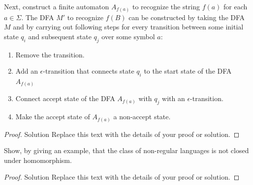 \documentclass[11pt]{article}
\newenvironment{problem}[2][Problem]{\begin{trivlist}
\item[\hskip \labelsep {\bfseries #1}\hskip \labelsep {\bfseries #2.}]}{\end{trivlist}}
\begin{document}
Next, construct a finite automaton $A_{f(a)}$ to recognize the string $f(a)$ for each $a \in \Sigma$. The DFA $M'$ to recognize $f(B)$ can be constructed by taking the DFA $M$ and by carrying out following steps for every transition between some initial state $q_{i}$ and subsequent state $q_{j}$ over some symbol $a$:
\begin{enumerate}
\item Remove the transition.
\item Add an $\epsilon$-transition that connects state $q_{i}$ to the start state of the DFA $A_{f(a)}$
\item Connect accept state of the DFA $A_{f(a)}$ with $q_{j}$ with an $\epsilon$-transition.
\item Make the accept state of $A_{f(a)}$ a non-accept state.
\end{enumerate}


\begin{proof}
Solution Replace this text with the details of your proof or solution.
\end{proof}

\begin{problem}[Part]{b}
Show, by giving an example, that the class of non-regular languages is not
closed under homomorphism.
\end{problem}

\begin{proof}
Solution Replace this text with the details of your proof or solution.
\end{proof}
\end{document}
